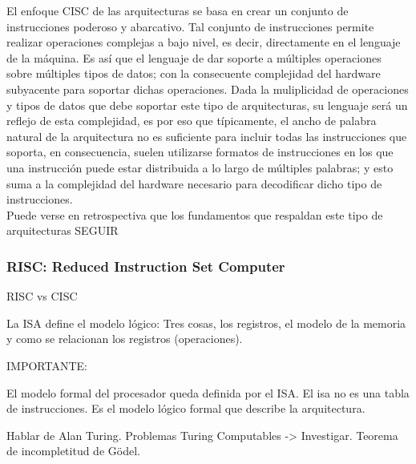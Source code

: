 El enfoque CISC de las arquitecturas se basa en crear un conjunto de 
instrucciones poderoso y abarcativo. Tal conjunto de instrucciones permite 
realizar operaciones complejas a bajo nivel, es decir, directamente en el 
lenguaje de la máquina. Es así que el lenguaje de dar soporte a múltiples 
operaciones sobre múltiples tipos de datos; con la consecuente complejidad del 
hardware subyacente para soportar dichas operaciones. Dada la muliplicidad de 
operaciones y tipos de datos que debe soportar este tipo de arquitecturas, su 
lenguaje será un reflejo de esta complejidad, es por eso que típicamente, el 
ancho de palabra natural de la arquitectura no es suficiente para incluir todas 
las instrucciones que soporta, en consecuencia, suelen utilizarse formatos de 
instrucciones en los que una instrucción puede estar distribuida a lo largo de 
múltiples palabras; y esto suma a la complejidad del hardware necesario para 
decodificar dicho tipo de instrucciones.\\
Puede verse en retrospectiva que los fundamentos que respaldan este tipo de 
arquitecturas SEGUIR


\subsubsection{RISC: Reduced Instruction Set Computer}
\label{subsubsec:theory-modern-isa_class-risc}


RISC vs CISC

La ISA define el modelo lógico: Tres cosas, los registros, el modelo de la
memoria y como se relacionan los registros (operaciones).



IMPORTANTE:

El modelo formal del procesador queda definida por el ISA. El isa no es una tabla de instrucciones. Es el modelo lógico formal que describe la arquitectura.

Hablar de Alan Turing. Problemas Turing Computables -> Investigar. Teorema de incompletitud de Gödel.
